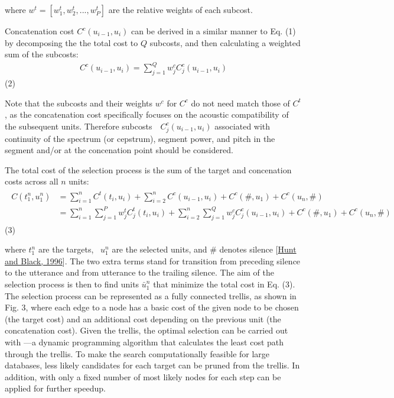 \documentclass[letterpaper,10pt,english]{jupyterBook}
\begin{document}
\sphinxAtStartPar
where \(w^{t} = [w^{t}_{1},
w^{t}_{2}, ..., w^{t}_{P}]\) are the
relative weights of each subcost.

\sphinxAtStartPar
Concatenation cost \(C^{c}(u_{i-1},u_{i})\)
can be derived in a similar manner to Eq. (1) by decomposing the the
total cost to \(Q\) subcosts, and then calculating a weighted sum of the
subcosts:
\begin{equation*}
\begin{split}
C^{c}(u_{i-1},u_i)=\sum_{j=1}^{Q}w_{j}^{c}C_{j}^{c}(u_{i-1},u_{i})
\end{split}
\end{equation*}
\sphinxAtStartPar
(2)

\sphinxAtStartPar
Note that the subcosts and their weights \(w^{c}\) for
\(C^{c}\) do not need match those of \(C^{t}\), as the
concatenation cost specifically focuses on the acoustic compatibility of
the subsequent units. Therefore
subcosts  \(C^{c}_{j}(u_{i-1},u_{i})\)
associated with continuity of the spectrum (or cepstrum), segment power,
and pitch in the segment and/or at the concenation point should be
considered.

\sphinxAtStartPar
The total cost of the selection process is the sum of the target and
concenation costs across all \(n\) units:
\begin{equation*}
\begin{split}
                  \begin{split}
C(t_{1}^{n},u_{1}^{n})&=\sum_{i=1}^{n}C^t(t_i,u_i)+\sum_{i=2}^{n}C^c(u_{i-1},u_i)+C^c(\#,u_1)+C^c(u_n,\#)
\\&
                   =
\sum_{i=1}^{n}\sum_{j=1}^{P}w_{j}^{t}C_{j}^{t}(t_{i},u_{i})+\sum_{i=2}^{n}\sum_{j=1}^{Q}w_{j}^{c}C_{j}^{c}(u_{i-1},u_{i})+C^c(\#,u_1)+C^c(u_n,\#)
\end{split}
\end{split}
\end{equation*}
\sphinxAtStartPar
(3)

\sphinxAtStartPar
where \( t_{1}^{n} \) are the targets,  \( u_{1}^{n} \) are the
selected units, and \# denotes silence {[}\hyperlink{cite.Synthesis/Concatenative_speech_synthesis:id54}{Hunt and Black, 1996}{]}. The two
extra terms stand for transition from preceding silence to the utterance
and from utterance to the trailing silence. The aim of the selection
process is then to find units \( \bar{u}_{1}^{n} \) that minimize
the total cost in Eq. (3). The selection process can be represented as a
fully connected trellis, as shown in Fig. 3, where each edge to a node
has a basic cost of the given node to be chosen (the target cost) and an
additional cost depending on the previous unit (the concatenation cost).
Given the trellis, the optimal selection can be carried out with
—a
dynamic programming algorithm that calculates the least cost path
through the trellis. To make the search computationally feasible for
large databases, less likely candidates for each target can be pruned
from the trellis. In addition,  with only a fixed
number of most likely nodes for each step can be applied for further
speedup.
\end{document}
